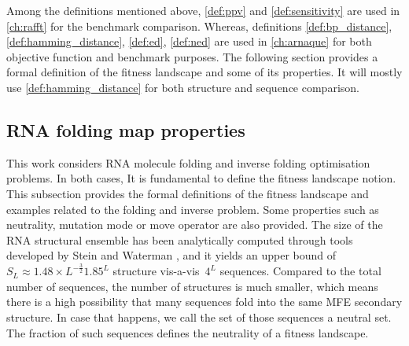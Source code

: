Among the definitions mentioned above, \autoref{def:ppv} and \autoref{def:sensitivity} are used in \autoref{ch:rafft} for the benchmark comparison. Whereas, definitions \autoref{def:bp_distance}, \autoref{def:hamming_distance}, \autoref{def:ed}, \autoref{def:ned} are used in \autoref{ch:arnaque} for both objective function and benchmark purposes. The following section provides a formal definition of the fitness landscape and some of its properties. It will mostly use \autoref{def:hamming_distance} for both structure and sequence comparison. 

\subsection{\ac{RNA} folding map properties}
\label{subsec:rnamap_properties}
This work considers \ac{RNA} molecule folding and inverse folding optimisation problems. In both cases, It is fundamental to define the fitness landscape notion. This subsection provides the formal definitions of the fitness landscape and examples related to the folding and inverse problem. Some properties such as neutrality, mutation mode or move operator are also provided. The size of the \ac{RNA} structural ensemble has been analytically computed through tools developed by Stein and Waterman \cite{stein1979some}, and it yields an upper bound of~\(S_L\approx1.48\times L^{-\frac{3}{2}}1.85^L\) structure vis-a-vis~\(4^L\) sequences. Compared to the total number of sequences, the number of structures is much smaller, which means there is a high possibility that many sequences fold into the same \ac{MFE} secondary structure. In case that happens, we call the set of those sequences a neutral set. The fraction of such sequences defines the neutrality of a fitness landscape.


